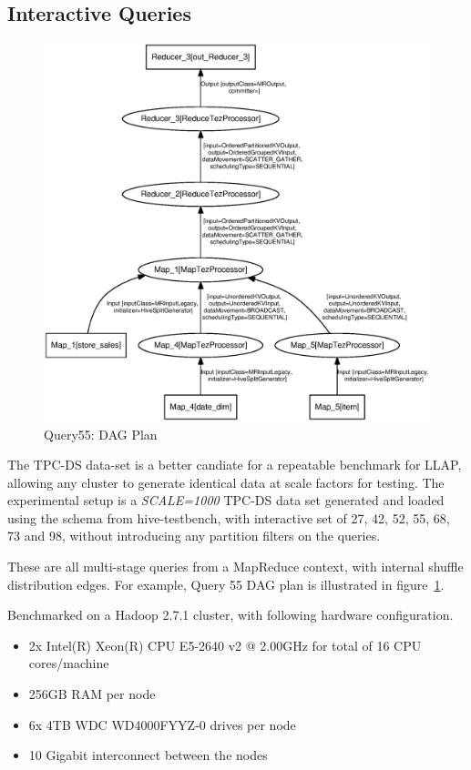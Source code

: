 \subsection{Interactive Queries}

\begin{figure}[bthp]
\centering
\includegraphics[width=0.8\columnwidth]{figures/q55.eps}
\caption{Query55: DAG Plan}
\label{fig:q55}
\end{figure} 

The TPC-DS data-set is a better candiate for a repeatable benchmark for LLAP, allowing any cluster to generate
identical data at scale factors for testing. The experimental setup is a \emph{SCALE=1000} TPC-DS data set generated
and loaded using the schema from hive-testbench\cite{testbench}, with interactive set of 27, 42, 52, 55, 68, 73 and 98, 
without introducing any partition filters on the queries.

These are all multi-stage queries from a MapReduce context, with internal shuffle distribution edges. For example, 
Query 55 DAG plan is illustrated in figure~\ref{fig:q55}.  

Benchmarked on a Hadoop 2.7.1 cluster, with following hardware configuration.

\begin{itemize}
\item 2x Intel(R) Xeon(R) CPU E5-2640 v2 @ 2.00GHz for total of 16 CPU cores/machine
\item 256GB RAM per node
\item 6x 4TB WDC WD4000FYYZ-0 drives per node
\item 10 Gigabit interconnect between the nodes
\end{itemize}

